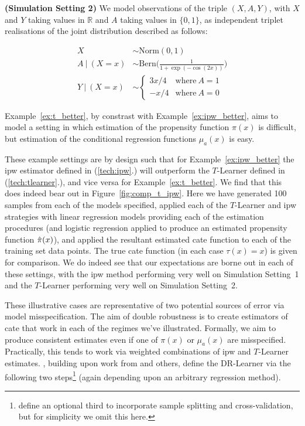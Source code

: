 \documentclass[../thesis.tex]{subfiles}
\begin{document}
\begin{example}{\textbf{(Simulation Setting 2)}} \label{ex:t_better}
We model observations of the triple $(X, A, Y)$, with $X$ and $Y$ taking values in $\mathbb{R}$ and $A$ taking values in $\{0,1\}$, as independent triplet realisations of the joint distribution described as follows:

\begin{align*}
X  & \sim \mathrm{Norm}(0, 1) \\    
A \ | \ (X = x) & \sim \mathrm{Bern}\Big(\frac{1}{1 + \exp(-\cos(2x))}\Big) \\ 
Y \ | \ (X = x) & \sim \begin{cases}
      3x/4 & \text{where} \ A = 1\\
      -x/4 & \text{where} \ A = 0
    \end{cases}
\end{align*}
\end{example}

Example~\ref{ex:t_better}, by constrast with Example~\ref{ex:ipw_better}, aims to model a setting in which estimation of the propensity function $\pi(x)$ is difficult, but estimation of the conditional regression functions $\mu_a(x)$ is easy. 

These example settings are by design such that for Example~\ref{ex:ipw_better} the \gls{ipw} estimator defined in (\ref{tech:ipw}.) will outperform the $T$-Learner defined in (\ref{tech:tlearner}.), and vice versa for Example~\ref{ex:t_better}. We find that this does indeed bear out in Figure~\ref{fig:comp_t_ipw}. Here we have generated 100 samples from each of the models specified, applied each of the $T$-Learner and \gls{ipw} strategies with linear regression models providing each of the estimation procedures (and logistic regression applied to produce an estimated propensity function $\hat{\pi}(x)$), and applied the resultant estimated \gls{cate} function to each of the training set data points. The true \gls{cate} function (in each case $\tau(x) = x$) is given for comparison. We do indeed see that our expectations are borne out in each of these settings, with the \gls{ipw} method performing very well on Simulation Setting~1 and the $T$-Learner performing very well on Simulation Setting~2.

These illustrative cases are representative of two potential sources of error via model misspecification. The aim of double robustness is to create estimators of \gls{cate} that work in each of the regimes we've illustrated. Formally, we aim to produce consistent estimates even if one of $\pi(x)$ or $\mu_a(x)$ are misspecified. Practically, this tends to work via weighted combinations of \gls{ipw} and $T$-Learner estimates. \citet{kennedy_towards_2022}, building upon work from \citet{nie_quasi-oracle_2021} and others, define the DR-Learner via the following two steps\footnote{\citet{kennedy_towards_2022} define an optional third to incorporate sample splitting and cross-validation, but for simplicity we omit this here.} (again depending upon an arbitrary regression method).
\end{document}
